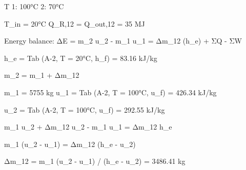 T  
1: 100°C  
2: 70°C  

T_in = 20°C  
Q_R,12 = Q_out,12 = 35 MJ  

Energy balance:  
ΔE = m_2 u_2 - m_1 u_1 = Δm_12 (h_e) + ΣQ - ΣW  

h_e = Tab (A-2, T = 20°C, h_f) = 83.16 kJ/kg  

m_2 = m_1 + Δm_12  

m_1 = 5755 kg  
u_1 = Tab (A-2, T = 100°C, u_f) = 426.34 kJ/kg  

u_2 = Tab (A-2, T = 100°C, u_f) = 292.55 kJ/kg  

m_1 u_2 + Δm_12 u_2 - m_1 u_1 = Δm_12 h_e  

m_1 (u_2 - u_1) = Δm_12 (h_e - u_2)  

Δm_12 = m_1 (u_2 - u_1) / (h_e - u_2) = 3486.41 kg